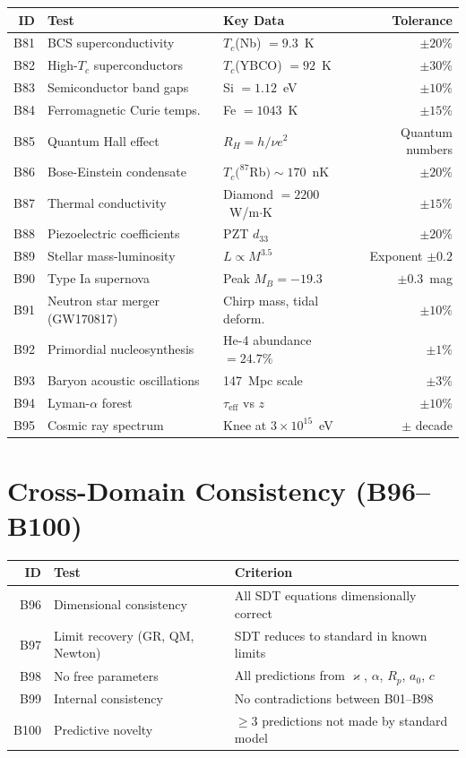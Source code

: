\documentclass[12pt,a4paper]{report}
\newcommand{\kop}{\varkappa}
\begin{document}
\begin{center}
\small
\begin{tabular}{rllr}
\toprule
\textbf{ID} & \textbf{Test} & \textbf{Key Data} & \textbf{Tolerance} \\
\midrule
B81 & BCS superconductivity & $T_c$(Nb) $= 9.3$~K & $\pm 20\%$ \\
B82 & High-$T_c$ superconductors & $T_c$(YBCO) $= 92$~K & $\pm 30\%$ \\
B83 & Semiconductor band gaps & Si $= 1.12$~eV & $\pm 10\%$ \\
B84 & Ferromagnetic Curie temps. & Fe $= 1043$~K & $\pm 15\%$ \\
B85 & Quantum Hall effect & $R_H = h/\nu e^2$ & Quantum numbers \\
B86 & Bose-Einstein condensate & $T_c(^{87}$Rb$) \sim 170$~nK & $\pm 20\%$ \\
B87 & Thermal conductivity & Diamond $= 2200$~W/m$\cdot$K & $\pm 15\%$ \\
B88 & Piezoelectric coefficients & PZT $d_{33}$ & $\pm 20\%$ \\
B89 & Stellar mass-luminosity & $L \propto M^{3.5}$ & Exponent $\pm 0.2$ \\
B90 & Type Ia supernova & Peak $M_B = -19.3$ & $\pm 0.3$~mag \\
B91 & Neutron star merger (GW170817) & Chirp mass, tidal deform. & $\pm 10\%$ \\
B92 & Primordial nucleosynthesis & He-4 abundance $= 24.7\%$ & $\pm 1\%$ \\
B93 & Baryon acoustic oscillations & 147~Mpc scale & $\pm 3\%$ \\
B94 & Lyman-$\alpha$ forest & $\tau_{\text{eff}}$ vs $z$ & $\pm 10\%$ \\
B95 & Cosmic ray spectrum & Knee at $3 \times 10^{15}$~eV & $\pm$ decade \\
\bottomrule
\end{tabular}
\end{center}

\section{Cross-Domain Consistency (B96--B100)}

\begin{center}
\small
\begin{tabular}{rll}
\toprule
\textbf{ID} & \textbf{Test} & \textbf{Criterion} \\
\midrule
B96 & Dimensional consistency & All SDT equations dimensionally correct \\
B97 & Limit recovery (GR, QM, Newton) & SDT reduces to standard in known limits \\
B98 & No free parameters & All predictions from $\kop$, $\alpha$, $R_p$, $a_0$, $c$ \\
B99 & Internal consistency & No contradictions between B01--B98 \\
B100 & Predictive novelty & $\geq 3$ predictions not made by standard model \\
\bottomrule
\end{tabular}
\end{center}
\end{document}
